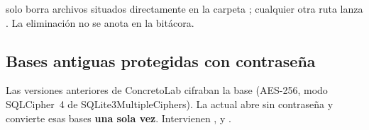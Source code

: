 \begin{consejo}
 solo borra archivos situados directamente en la carpeta ; cualquier otra
ruta lanza . La eliminación no se anota en la bitácora.
\end{consejo}

\subsection{Bases antiguas protegidas con contraseña}
\label{sec:bd-cifrada}

Las versiones anteriores de ConcretoLab cifraban la base (AES-256, modo SQLCipher~4 de SQLite3MultipleCiphers). La
actual abre sin contraseña y convierte esas bases \textbf{una sola vez}. Intervienen ,
 y .

